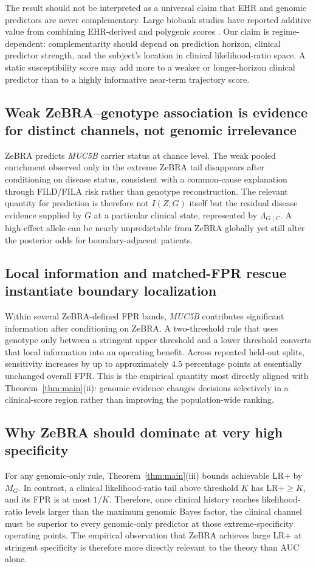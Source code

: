 \documentclass[journal]{IEEEtran}
\newcommand{\LR}{\Lambda}
\begin{document}
The result should not be interpreted as a universal claim that EHR and genomic predictors are never complementary. Large biobank studies have reported additive value from combining EHR-derived and polygenic scores \cite{Detrois2025}. Our claim is regime-dependent: complementarity should depend on prediction horizon, clinical predictor strength, and the subject's location in clinical likelihood-ratio space. A static susceptibility score may add more to a weaker or longer-horizon clinical predictor than to a highly informative near-term trajectory score.

\subsection{Weak ZeBRA--genotype association is evidence for distinct channels, not genomic irrelevance}
ZeBRA predicts \textit{MUC5B} carrier status at chance level. The weak pooled enrichment observed only in the extreme ZeBRA tail disappears after conditioning on disease status, consistent with a common-cause explanation through FILD/FILA risk rather than genotype reconstruction. The relevant quantity for prediction is therefore not $I(Z;G)$ itself but the residual disease evidence supplied by $G$ at a particular clinical state, represented by $\LR_{G\mid C}$. A high-effect allele can be nearly unpredictable from ZeBRA globally yet still alter the posterior odds for boundary-adjacent patients.

\subsection{Local information and matched-FPR rescue instantiate boundary localization}
Within several ZeBRA-defined FPR bands, \textit{MUC5B} contributes significant information after conditioning on ZeBRA. A two-threshold rule that uses genotype only between a stringent upper threshold and a lower threshold converts that local information into an operating benefit. Across repeated held-out splits, sensitivity increases by up to approximately 4.5 percentage points at essentially unchanged overall FPR. This is the empirical quantity most directly aligned with Theorem~\ref{thm:main}(ii): genomic evidence changes decisions selectively in a clinical-score region rather than improving the population-wide ranking.

\subsection{Why ZeBRA should dominate at very high specificity}
For any genomic-only rule, Theorem~\ref{thm:main}(iii) bounds achievable LR$+$ by $M_G$. In contrast, a clinical likelihood-ratio tail above threshold $K$ has LR$+\ge K$, and its FPR is at most $1/K$. Therefore, once clinical history reaches likelihood-ratio levels larger than the maximum genomic Bayes factor, the clinical channel must be superior to every genomic-only predictor at those extreme-specificity operating points. The empirical observation that ZeBRA achieves large LR$+$ at stringent specificity is therefore more directly relevant to the theory than AUC alone.
\end{document}
